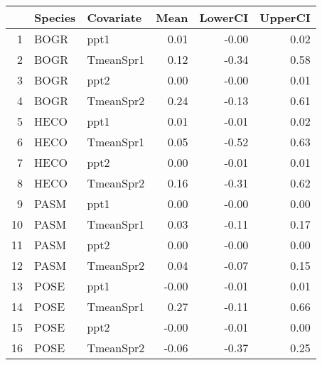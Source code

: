 \begin{table}[ht]
\centering
\begin{tabular}{rllrrr}
  \hline
 & Species & Covariate & Mean & LowerCI & UpperCI \\ 
  \hline
1 & BOGR & ppt1 & 0.01 & -0.00 & 0.02 \\ 
  2 & BOGR & TmeanSpr1 & 0.12 & -0.34 & 0.58 \\ 
  3 & BOGR & ppt2 & 0.00 & -0.00 & 0.01 \\ 
  4 & BOGR & TmeanSpr2 & 0.24 & -0.13 & 0.61 \\ 
  5 & HECO & ppt1 & 0.01 & -0.01 & 0.02 \\ 
  6 & HECO & TmeanSpr1 & 0.05 & -0.52 & 0.63 \\ 
  7 & HECO & ppt2 & 0.00 & -0.01 & 0.01 \\ 
  8 & HECO & TmeanSpr2 & 0.16 & -0.31 & 0.62 \\ 
  9 & PASM & ppt1 & 0.00 & -0.00 & 0.00 \\ 
  10 & PASM & TmeanSpr1 & 0.03 & -0.11 & 0.17 \\ 
  11 & PASM & ppt2 & 0.00 & -0.00 & 0.00 \\ 
  12 & PASM & TmeanSpr2 & 0.04 & -0.07 & 0.15 \\ 
  13 & POSE & ppt1 & -0.00 & -0.01 & 0.01 \\ 
  14 & POSE & TmeanSpr1 & 0.27 & -0.11 & 0.66 \\ 
  15 & POSE & ppt2 & -0.00 & -0.01 & 0.00 \\ 
  16 & POSE & TmeanSpr2 & -0.06 & -0.37 & 0.25 \\ 
   \hline
\end{tabular}
\end{table}
